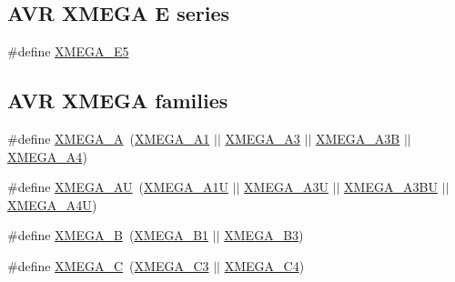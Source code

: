 \subsection*{A\-V\-R X\-M\-E\-G\-A E series}
\begin{DoxyCompactItemize}
\item 
\#define \hyperlink{group__xmega__part__macros__group_ga3bbcf2e955c9747a3595f8cdc01436ba}{X\-M\-E\-G\-A\-\_\-\-E5}
\end{DoxyCompactItemize}
\subsection*{A\-V\-R X\-M\-E\-G\-A families}
\begin{DoxyCompactItemize}
\item 
\#define \hyperlink{group__xmega__part__macros__group_gab903a90d3a0bc99d7248eaecbb325a23}{X\-M\-E\-G\-A\-\_\-\-A}~(\hyperlink{group__xmega__part__macros__group_gaa0df665226b6faf69dcc137f1b78f074}{X\-M\-E\-G\-A\-\_\-\-A1} $|$$|$ \hyperlink{group__xmega__part__macros__group_ga831948bd467aa2355eb76ec708d2921a}{X\-M\-E\-G\-A\-\_\-\-A3} $|$$|$ \hyperlink{group__xmega__part__macros__group_ga32fef354d7f092b04ec41a0733e2c7ae}{X\-M\-E\-G\-A\-\_\-\-A3\-B} $|$$|$ \hyperlink{group__xmega__part__macros__group_ga7b83a133489c9896dbdc730615c83be8}{X\-M\-E\-G\-A\-\_\-\-A4})
\item 
\#define \hyperlink{group__xmega__part__macros__group_ga55210f3805902072fce76647b50fa177}{X\-M\-E\-G\-A\-\_\-\-A\-U}~(\hyperlink{group__xmega__part__macros__group_ga6672329ddee03af905aa378946568b67}{X\-M\-E\-G\-A\-\_\-\-A1\-U} $|$$|$ \hyperlink{group__xmega__part__macros__group_gab5232598231cc5c17658e4b7cc5293ec}{X\-M\-E\-G\-A\-\_\-\-A3\-U} $|$$|$ \hyperlink{group__xmega__part__macros__group_ga98083f3307fe61cc2377948db87cd708}{X\-M\-E\-G\-A\-\_\-\-A3\-B\-U} $|$$|$ \hyperlink{group__xmega__part__macros__group_ga7625edcdd219df905c870d73c1689da6}{X\-M\-E\-G\-A\-\_\-\-A4\-U})
\item 
\#define \hyperlink{group__xmega__part__macros__group_ga62f2c1c93640237425cb64186ddce219}{X\-M\-E\-G\-A\-\_\-\-B}~(\hyperlink{group__xmega__part__macros__group_gaa2fd55860a1bbc05c6d0d384e7476596}{X\-M\-E\-G\-A\-\_\-\-B1} $|$$|$ \hyperlink{group__xmega__part__macros__group_ga7385be70af05a3a61864a4fc470fa39d}{X\-M\-E\-G\-A\-\_\-\-B3})
\item 
\#define \hyperlink{group__xmega__part__macros__group_ga75b06dd59d29b1de54dd73fe67830973}{X\-M\-E\-G\-A\-\_\-\-C}~(\hyperlink{group__xmega__part__macros__group_ga10c26d10c3df7d9874e4527d1327c60b}{X\-M\-E\-G\-A\-\_\-\-C3} $|$$|$ \hyperlink{group__xmega__part__macros__group_ga8add217f9d3d28fda40ec91e65a5d970}{X\-M\-E\-G\-A\-\_\-\-C4})

\end{DoxyCompactItemize}
